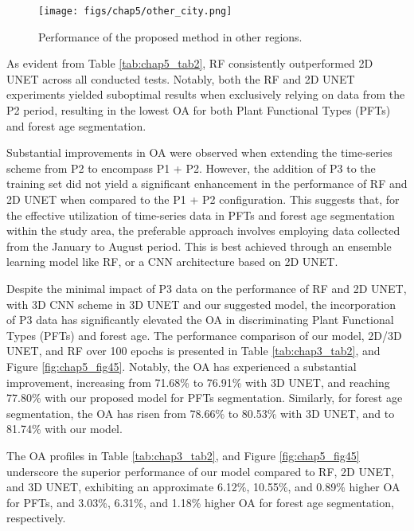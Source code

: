 \begin{figure}[tbh!]
    \centering
    \texttt{[image: figs/chap5/other\_city.png]}
    \caption[PFTs mapping in other regions]{Performance of the proposed method in other regions.}
    \label{fig:chap5_fig8}
\end{figure}

As evident from Table \ref{tab:chap5_tab2}, RF consistently outperformed 2D UNET across all conducted tests. Notably, both the RF and 2D UNET experiments yielded suboptimal results when exclusively relying on data from the P2 period, resulting in the lowest OA for both Plant Functional Types (PFTs) and forest age segmentation. \par

Substantial improvements in OA were observed when extending the time-series scheme from P2 to encompass P1 + P2. However, the addition of P3 to the training set did not yield a significant enhancement in the performance of RF and 2D UNET when compared to the P1 + P2 configuration. This suggests that, for the effective utilization of time-series data in PFTs and forest age segmentation within the study area, the preferable approach involves employing data collected from the January to August period. This is best achieved through an ensemble learning model like RF, or a CNN architecture based on 2D UNET. \par

Despite the minimal impact of P3 data on the performance of RF and 2D UNET, with 3D CNN scheme in 3D UNET and our suggested model, the incorporation of P3 data has significantly elevated the OA in discriminating Plant Functional Types (PFTs) and forest age. The performance comparison of our model, 2D/3D UNET, and RF over 100 epochs is presented in Table \ref{tab:chap3_tab2}, and Figure \ref{fig:chap5_fig45}. Notably, the OA has experienced a substantial improvement, increasing from 71.68\% to 76.91\% with 3D UNET, and reaching 77.80\% with our proposed model for PFTs segmentation. Similarly, for forest age segmentation, the OA has risen from 78.66\% to 80.53\% with 3D UNET, and to 81.74\% with our model. \par

The OA profiles in Table \ref{tab:chap3_tab2}, and Figure \ref{fig:chap5_fig45} underscore the superior performance of our model compared to RF, 2D UNET, and 3D UNET, exhibiting an approximate 6.12\%, 10.55\%, and 0.89\% higher OA for PFTs, and 3.03\%, 6.31\%, and 1.18\% higher OA for forest age segmentation, respectively. \par

